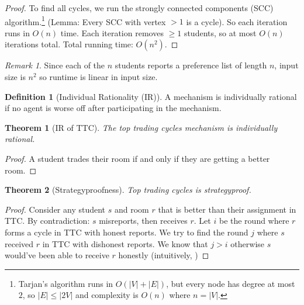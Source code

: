 \documentclass[dvipsnames]{article}
\newtheorem{theorem}{Theorem}[section]
\theoremstyle{definition}
\newtheorem{definition}{Definition}[section]
\theoremstyle{remark}
\newtheorem*{remark}{Remark}
\begin{document}
\begin{proof}
	To find all cycles, we run the strongly connected components (SCC) algorithm.\footnote{Tarjan's algorithm runs in $O(|V| + |E|)$, but every node has degree at most $2$, so $|E| \leq |2V|$ and complexity is $O(n)$ where $n = |V|$.} 
	(Lemma: Every SCC with vertex $>1$ is a cycle).
	So each iteration runs in $O(n)$ time. 
	Each iteration removes $\geq 1$ students,
	so at most $O(n)$ iterations total.
	Total running time: $O(n^2)$.
\end{proof}

\begin{remark}
	Since each of the $n$ students reports a preference list of length $n$, input size is $n^2$ so runtime is linear in input size. 
\end{remark}

\begin{definition}[Individual Rationality (IR)]
	A mechanism is individually rational if no agent is worse off after participating in the mechanism. 
\end{definition}

\begin{theorem}[IR of TTC]
	The top trading cycles mechanism is individually rational.
\end{theorem}

\begin{proof}
	A student trades their room if and only if they are getting a better room.
\end{proof}

\begin{theorem}[Strategyproofness]
	Top trading cycles is strategyproof.
\end{theorem}

\begin{proof}
	
	Consider any student $s$ and room $r$ that is better than their assignment in TTC.
	By contradiction: $s$ misreports, then receives $r$. 
	Let $i$ be the round where $r$ forms a cycle in TTC with honest reports.
	We try to find the round $j$ where $s$ received $r$ in TTC with dishonest reports.
	We know that $j > i$ otherwise $s$ would've been able to receive $r$ honestly (intuitively, )
\end{proof}
\end{document}
